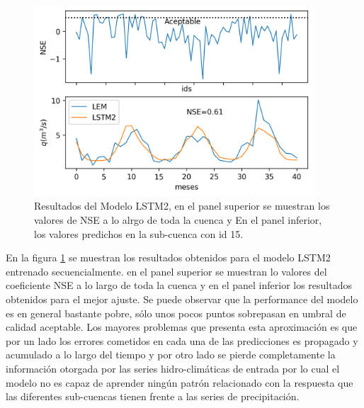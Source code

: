 \begin{figure}[h!]
\begin{center}
  \includegraphics[height=2.8in]{Figures/seq/results_seq.png}

  \caption{ Resultados del Modelo LSTM2, en el panel superior se muestran los valores de NSE a lo alrgo de toda la cuenca y En
  el panel inferior, los valores predichos en la sub-cuenca con id 15. }
  \label{seq15}
\end{center}
\end{figure}

En la figura \ref{seq15} se muestran los resultados obtenidos para el modelo LSTM2 entrenado secuencialmente. 
en el panel superior se muestran lo valores del coeficiente NSE a lo largo de toda la cuenca
y en el panel inferior los resultados obtenidos para el mejor ajuste. Se puede observar que
la performance del modelo es en general bastante pobre, sólo unos pocos puntos sobrepasan en umbral de calidad aceptable.
Los mayores problemas que presenta esta aproximación es que por un lado los errores cometidos en cada una de las
predicciones es propagado y acumulado a lo largo del tiempo y por otro lado se pierde completamente
la información otorgada por las series hidro-climáticas de entrada por lo cual el modelo no es capaz de aprender ningún 
patrón relacionado con la respuesta que las diferentes sub-cuencas tienen frente a las series de precipitación.  









